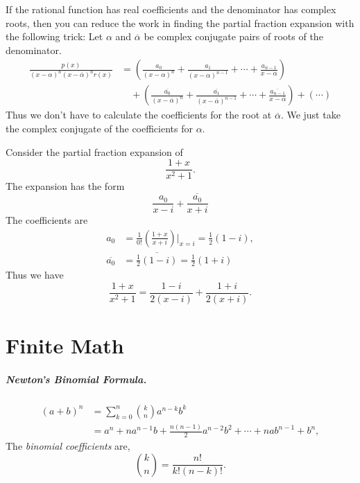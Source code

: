If the rational function has real coefficients and the denominator 
has complex roots, then you can reduce the work in finding the partial 
fraction expansion with the following trick:  Let $\alpha$ and $\overline{\alpha}$
be complex conjugate pairs of roots of the denominator.
\begin{align*}
  \frac{p(x)}{(x-\alpha)^n (x- \overline{\alpha})^n r(x)} 
  &= \left( \frac{a_0}{(x-\alpha)^n} 
    + \frac{a_1}{(x-\alpha)^{n-1}} + \cdots + \frac{a_{n-1}}{x-\alpha}
  \right) \\
  &\quad + \left( \frac{\overline{a_0}}{(x-\overline{\alpha})^n} 
    + \frac{\overline{a_1}}{(x-\overline{\alpha})^{n-1}} + \cdots 
    + \frac{\overline{a_{n-1}}}{x-\overline{\alpha}} \right) 
  + (\cdots)
\end{align*}
Thus we don't have to calculate the coefficients for the root at 
$\overline{\alpha}$.  We just take the complex conjugate of the coefficients
for $\alpha$.





\begin{Example}
  Consider the partial fraction expansion of 
  \[
  \frac{1+x}{x^2+1}.
  \]
  The expansion has the form
  \[
  \frac{a_0}{x-i} + \frac{\overline{a_0}}{x+i} 
  \]
  The coefficients are
  \begin{align*}
    a_0     &= \frac{1}{0!} \left(\frac{1+x}{x+i} \right) 
    \bigg|_{x=i} = \frac{1}{2}(1-i), \\
    \overline{a_0} &= \overline{ \frac{1}{2}(1-i)} = \frac{1}{2}(1+i)
  \end{align*}
  Thus we have
  \[
  \frac{1+x}{x^2+1} = \frac{1-i}{2(x-i)} + \frac{1+i}{2(x+i)}.
  \]
\end{Example}












\raggedbottom
\chapter{Finite Math}
\flushbottom


\paragraph{Newton's Binomial Formula.}
\begin{align*}
  (a+b)^n &= \sum_{k=0}^n \binom{k}{n} a^{n-k} b^k \\
  &= a^n + n a^{n-1} b + \frac{n(n-1)}{2} a^{n-2} b^2 + \cdots 
  + n a b^{n-1} + b^n,
\end{align*}
The \textit{binomial coefficients} are,
\[
\binom{k}{n} = \frac{n!}{k! (n-k)!}.
\]


